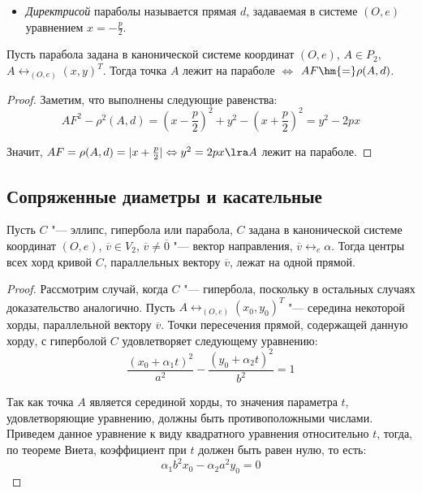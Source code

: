 {\begin{definition}
\begin{itemize}
		\item \textit{Директрисой} параболы называется прямая $d$, задаваемая в системе $(O, e)$ уравнением $x = -\frac{p}{2}$.
	\end{itemize}
\end{definition}

\begin{theorem}
	Пусть парабола задана в канонической системе координат $(O, e)$, $A \in P_2$, $A \leftrightarrow_{(O, e)} (x, y)^T$. Тогда точка $A$ лежит на параболе $\Leftrightarrow$ $AF \hm{=} \rho(A, d)$.
\end{theorem}

\begin{proof}
	Заметим, что выполнены следующие равенства:
	\[AF^2 - \rho^2(A, d) = \left(x - \frac{p}{2}\right)^2 + y^2 - \left(x + \frac{p}{2}\right)^2 = y^2 - 2px\]
	
	Значит, $AF = \rho(A, d) = |x + \frac{p}{2}| \Leftrightarrow y^2 = 2px \lra A$ лежит на параболе.
\end{proof}

\subsection{Сопряженные диаметры и касательные}

\begin{theorem}
	Пусть $C$ "--- эллипс, гипербола или парабола, $C$ задана в канонической системе координат $(O, e)$, $\overline{v} \in V_2$, $\overline{v} \ne \overline 0$ "--- вектор направления, $\overline{v} \leftrightarrow_{e} \alpha$. Тогда центры всех хорд кривой $C$, параллельных вектору $\overline{v}$, лежат на одной прямой.
\end{theorem}

\begin{proof}
	Рассмотрим случай, когда $C$ "--- гипербола, поскольку в остальных случаях доказательство аналогично. Пусть $A \leftrightarrow_{(O, e)} (x_0, y_0)^T$ "--- середина некоторой хорды, параллельной вектору $\overline{v}$. Точки пересечения прямой, содержащей данную хорду, с гиперболой $C$ удовлетворяет следующему уравнению:
	\[\frac{(x_0 + \alpha_1 t)^2}{a^2} - \frac{(y_0 + \alpha_2 t)^2}{b^2} = 1\]
	
	Так как точка $A$ является серединой хорды, то значения параметра $t$, удовлетворяющие уравнению, должны быть противоположными числами. Приведем данное уравнение к виду квадратного уравнения относительно $t$, тогда, по теореме Виета, коэффициент при $t$ должен быть равен нулю, то есть:
	\[\alpha_1 b^2 x_0 - \alpha_2 a^2 y_0 = 0\]
	

\end{proof}}
